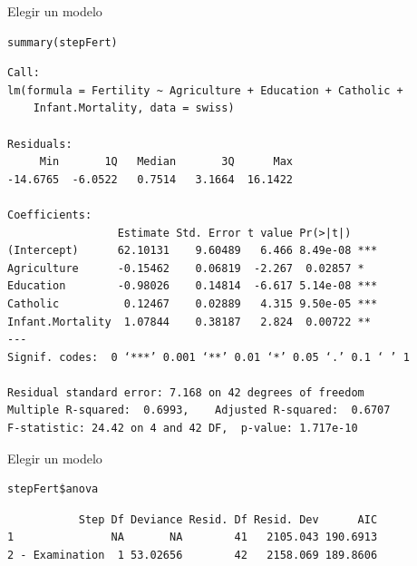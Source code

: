 \documentclass[xcolor={usenames,svgnames,dvipsnames}]{beamer}
\begin{document}
\begin{frame}[fragile,label=sec-5-14]{Elegir un modelo}
 \lstset{language=R,label= ,caption= ,numbers=none}
\begin{lstlisting}
summary(stepFert)
\end{lstlisting}

\begin{verbatim}
Call:
lm(formula = Fertility ~ Agriculture + Education + Catholic + 
    Infant.Mortality, data = swiss)

Residuals:
     Min       1Q   Median       3Q      Max 
-14.6765  -6.0522   0.7514   3.1664  16.1422 

Coefficients:
                 Estimate Std. Error t value Pr(>|t|)    
(Intercept)      62.10131    9.60489   6.466 8.49e-08 ***
Agriculture      -0.15462    0.06819  -2.267  0.02857 *  
Education        -0.98026    0.14814  -6.617 5.14e-08 ***
Catholic          0.12467    0.02889   4.315 9.50e-05 ***
Infant.Mortality  1.07844    0.38187   2.824  0.00722 ** 
---
Signif. codes:  0 ‘***’ 0.001 ‘**’ 0.01 ‘*’ 0.05 ‘.’ 0.1 ‘ ’ 1

Residual standard error: 7.168 on 42 degrees of freedom
Multiple R-squared:  0.6993,	Adjusted R-squared:  0.6707 
F-statistic: 24.42 on 4 and 42 DF,  p-value: 1.717e-10
\end{verbatim}
\end{frame}

\begin{frame}[fragile,label=sec-5-15]{Elegir un modelo}
 \lstset{language=R,label= ,caption= ,numbers=none}
\begin{lstlisting}
stepFert$anova
\end{lstlisting}

\begin{verbatim}
           Step Df Deviance Resid. Df Resid. Dev      AIC
1               NA       NA        41   2105.043 190.6913
2 - Examination  1 53.02656        42   2158.069 189.8606
\end{verbatim}
\end{frame}
\end{document}

